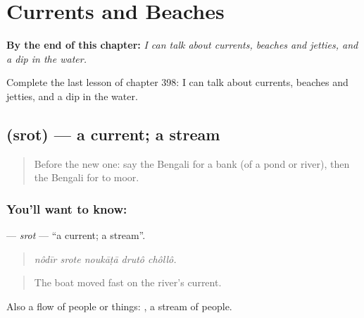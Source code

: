 
\chapter{Currents and Beaches}
\label{ch:bn-currents-and-beaches}

\begin{chapteropening}
\textbf{By the end of this chapter:} \emph{I can talk about currents, beaches and jetties, and a dip in the water.}

Complete the last lesson of chapter 398: I can talk about currents, beaches and jetties, and a dip in the water.
\end{chapteropening}

\section[\texorpdfstring{\bn{স্রোত} (srot)}{স্রোত (srot)}]{ (srot) — a current; a stream}

\label{lesson:BN-C398-srot}



\begin{quote}
Before the new one: say the Bengali for a bank (of a pond or river), then the Bengali for to moor.
\end{quote}

\subsection*{You'll want to know: }
\textbf{} — \emph{srot} — \textquotedblleft{}a current; a stream\textquotedblright{}.

\begin{quote}
    
\end{quote}

\begin{quote}
\emph{nôdīr srote noukāṭā drutô chôllô.}
\end{quote}

\begin{quote}
The boat moved fast on the river's current.
\end{quote}

Also a flow of people or things:  , a stream of people.

